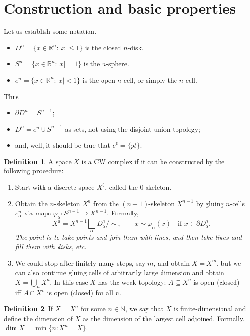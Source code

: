 \documentclass{book}
\theoremstyle{definition}
\newtheorem*{defn}{Definition}
\begin{document}
\section{Construction and basic properties}

Let us establish some notation.
\begin{itemize}
\item $D^n=\{x\in\mathbb R^n:|x|\leq1\}$ is the closed
$n$-disk.
\item $S^n=\{x\in\mathbb R^n:|x|=1\}$ is the $n$-sphere.
\item $e^n=\{x\in\mathbb R^n:|x|<1\}$ is the open $n$-cell,
or simply the $n$-cell.
\end{itemize}
Thus
\begin{itemize}
\item $\partial D^n=S^{n-1}$;
\item $D^n=e^n\cup S^{n-1}$ as sets, not using the disjoint
union topology;
\item and, well, it should be true that $e^0=\{pt\}$.
\end{itemize}

\begin{defn}
A space $X$ is a CW complex if it can be constructed by the
following procedure:
\begin{enumerate}
\item Start with a discrete space $X^0$, called the
0-skeleton.
\item Obtain the $n$-skeleton $X^n$ from the $(n-1)$-skeleton
$X^{n-1}$ by gluing $n$-cells $e^n_\alpha$ via maps
$\varphi_\alpha:S^{n-1}\to X^{n-1}$. Formally,
$$
X^n=X^{n-1}\bigsqcup_\alpha D^n_\alpha\Big/\sim,
\qquad
x\sim\varphi_\alpha(x)
\quad\text{if }x\in\partial D^n_\alpha.
$$
\textit{The point is to take points and join them with lines,
and then take lines and fill them with disks, etc.}
\item We could stop after finitely many steps, say $m$, and
obtain $X=X^m$, but we can also continue gluing cells of
arbitrarily large dimension and obtain $X=\bigcup_nX^n$. In
this case $X$ has the weak topology: $A\subseteq X^n$ is open
(closed) iff $A\cap X^n$ is open (closed) for all $n$.
\end{enumerate}
\end{defn}

\begin{defn}
If $X=X^n$ for some $n\in\mathbb N$, we say that $X$ is
finite-dimensional and define the dimension of $X$ as the
dimension of the largest cell adjoined. Formally,
$\dim X=\min\{n:X^n=X\}$.
\end{defn}
\end{document}
